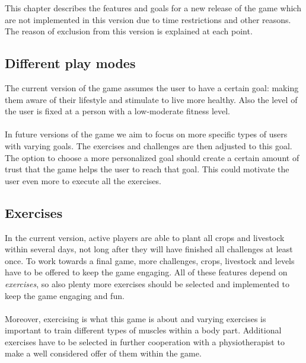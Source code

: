 
This chapter describes the features and goals for a new release of the game which are not implemented in this version due to time restrictions and other reasons. The reason of exclusion from this version is explained at each point.

\subsection{Different play modes}
The current version of the game assumes the user to have a certain goal: making them aware of their lifestyle and stimulate to live more healthy. Also the level of the user is fixed at a person with a low-moderate fitness level.
\\\\
In future versions of the game we aim to focus on more specific types of users with varying goals. The exercises and challenges are then adjusted to this goal. The option to choose a more personalized goal should create a certain amount of trust that the game helps the user to reach that goal. This could motivate the user even more to execute all the exercises. 

\subsection{Exercises}
In the current version, active players are able to plant all crops and livestock within several days, not long after they will have finished all challenges at least once. To work towards a final game, more challenges, crops, livestock and levels have to be offered to keep the game engaging. All of these features depend on \textit{exercises}, so also plenty more exercises should be selected and implemented to keep the game engaging and fun. 
\\\\
Moreover, exercising is what this game is about and varying exercises is important to train different types of muscles within a body part. Additional exercises have to be selected in further cooperation with a physiotherapist to make a well considered offer of them within the game.

